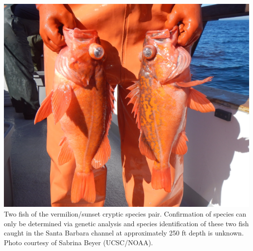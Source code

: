 \documentclass[11pt,
  english,
  a4paper,
]{article}
\begin{document}
\newpage
\thispagestyle{empty} %

\pagestyle{plain}  %
\renewcommand*{\thefootnote}{\arabic{footnote}}  %
\setcounter{footnote}{0}  %
\renewcommand{\headrulewidth}{0.5pt}
\renewcommand{\footrulewidth}{0.5pt}

\newcommand{\lt}{\ensuremath <}
\newcommand{\gt}{\ensuremath >}

\newcommand\CapeM{$40^\circ 10^\prime N$}
\newcommand\PtC{$34^\circ 27^\prime N$}
\newcommand\CAOR{$42^\circ 00^\prime N$}

\newpage

\includegraphics{cover_photo.png} Two fish of the vermilion/sunset cryptic species pair. Confirmation of species can only be determined via genetic analysis and species identification of these two fish caught in the Santa Barbara channel at approximately 250 ft depth is unknown. Photo courtesy of Sabrina Beyer (UCSC/NOAA).

\pagebreak
{}
\setcounter{page}{1}

\renewcommand{\thetable}{\roman{table}}
\renewcommand{\thefigure}{\roman{figure}}

\setlength\parskip{0.5em plus 0.1em minus 0.2em}

\end{document}
